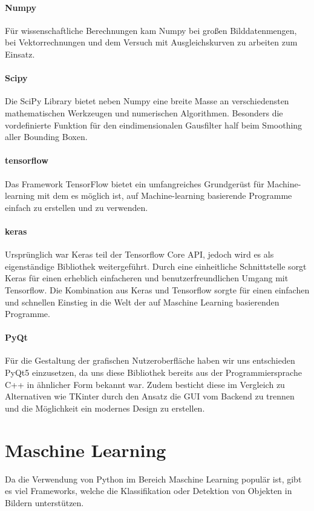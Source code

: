 \paragraph{Numpy}
Für wissenschaftliche Berechnungen kam Numpy bei großen Bilddatenmengen, bei Vektorrechnungen und dem Versuch mit Ausgleichskurven zu arbeiten zum Einsatz.

\paragraph{Scipy}
Die SciPy Library bietet neben Numpy eine breite Masse an verschiedensten mathematischen Werkzeugen und numerischen Algorithmen. Besonders die vordefinierte Funktion für den eindimensionalen Gausfilter half beim Smoothing aller Bounding Boxen.

\paragraph{tensorflow}
Das Framework TensorFlow bietet ein umfangreiches Grundgerüst für Machine-learning mit dem es möglich ist, auf Machine-learning basierende Programme einfach zu erstellen und zu verwenden.

\paragraph{keras}
Ursprünglich war Keras teil der Tensorflow Core API, jedoch wird es als eigenständige Bibliothek weitergeführt. Durch eine einheitliche Schnittstelle sorgt Keras für einen erheblich einfacheren und benutzerfreundlichen Umgang mit Tensorflow. Die Kombination aus Keras und Tensorflow sorgte für einen einfachen und schnellen Einstieg in die Welt der auf Maschine Learning basierenden Programme.

\paragraph{PyQt}
Für die Gestaltung der grafischen Nutzeroberfläche haben wir uns entschieden PyQt5 einzusetzen, da uns diese Bibliothek bereits aus der Programmiersprache C++ in ähnlicher Form bekannt war. Zudem besticht diese im Vergleich zu Alternativen wie TKinter durch den Ansatz die GUI vom Backend zu trennen und die Möglichkeit ein modernes Design zu erstellen.

	
\section{Maschine Learning}
Da die Verwendung von Python im Bereich Maschine Learning populär ist, gibt es viel Frameworks, welche die Klassifikation oder Detektion von Objekten in Bildern unterstützen.

